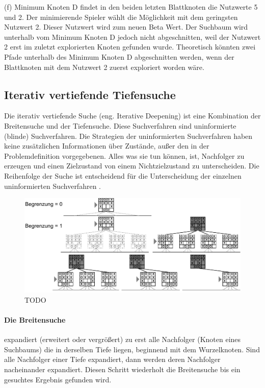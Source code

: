 (f) Minimum Knoten D findet in den beiden letzten Blattknoten die Nutzwerte 5 und 2. Der minimierende Spieler wählt die Möglichkeit mit dem geringsten Nutzwert 2. Dieser Nutzwert wird zum neuen Beta Wert. Der Suchbaum wird unterhalb vom Minimum Knoten D jedoch nicht abgeschnitten, weil der Nutzwert 2 erst im zuletzt explorierten Knoten gefunden wurde. Theoretisch könnten zwei Pfade unterhalb des Minimum Knoten D abgeschnitten werden, wenn der Blattknoten mit dem Nutzwert 2 zuerst exploriert worden wäre.

\subsection{Iterativ vertiefende Tiefensuche}
\label{subsec:Iterativ vertiefende Tiefensuche}
Die iterativ vertiefende Suche (eng. Iterative Deepening) ist eine Kombination der Breitensuche und der Tiefensuche. Diese Suchverfahren sind uninformierte (blinde) Suchverfahren. Die Strategien der uninformierten Suchverfahren haben keine zusätzlichen Informationen über Zustände, außer den in der Problemdefinition vorgegebenen. Alles was sie tun können, ist, Nachfolger zu erzeugen und einen Zielzustand von einem Nichtzielzustand zu unterscheiden. Die Reihenfolge der Suche ist entscheidend für die Unterscheidung der einzelnen uninformierten Suchverfahren \cite[116]{Russell}. \\
 
\begin{figure}[!htbp]
  \centering
  \includegraphics[scale = 0.9]{inhalt/abbildungen/iterative_deepening_tictactoe.pdf}
  \caption{TODO }
  \label{fig:minimax_tictactoe}
\end{figure}  
 
\paragraph{Die Breitensuche} expandiert (erweitert oder vergrößert) zu erst alle Nachfolger (Knoten eines Suchbaums) die in derselben Tiefe liegen, beginnend mit dem Wurzelknoten. Sind alle Nachfolger einer Tiefe expandiert, dann werden deren Nachfolger nacheinander expandiert. Diesen Schritt wiederholt die Breitensuche bis ein gesuchtes Ergebnis gefunden wird. \\


